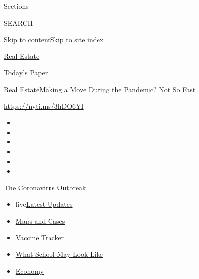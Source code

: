 Sections

SEARCH

\protect\hyperlink{site-content}{Skip to
content}\protect\hyperlink{site-index}{Skip to site index}

\href{https://www.nytimes.com/section/realestate}{Real Estate}

\href{https://myaccount.nytimes.com/auth/login?response_type=cookie\&client_id=vi}{}

\href{https://www.nytimes.com/section/todayspaper}{Today's Paper}

\href{/section/realestate}{Real Estate}\textbar{}Making a Move During
the Pandemic? Not So Fast

\url{https://nyti.ms/3hDO6YI}

\begin{itemize}
\item
\item
\item
\item
\item
\item
\end{itemize}

\href{https://www.nytimes.com/news-event/coronavirus?action=click\&pgtype=Article\&state=default\&region=TOP_BANNER\&context=storylines_menu}{The
Coronavirus Outbreak}

\begin{itemize}
\tightlist
\item
  live\href{https://www.nytimes.com/2020/08/01/world/coronavirus-covid-19.html?action=click\&pgtype=Article\&state=default\&region=TOP_BANNER\&context=storylines_menu}{Latest
  Updates}
\item
  \href{https://www.nytimes.com/interactive/2020/us/coronavirus-us-cases.html?action=click\&pgtype=Article\&state=default\&region=TOP_BANNER\&context=storylines_menu}{Maps
  and Cases}
\item
  \href{https://www.nytimes.com/interactive/2020/science/coronavirus-vaccine-tracker.html?action=click\&pgtype=Article\&state=default\&region=TOP_BANNER\&context=storylines_menu}{Vaccine
  Tracker}
\item
  \href{https://www.nytimes.com/interactive/2020/07/29/us/schools-reopening-coronavirus.html?action=click\&pgtype=Article\&state=default\&region=TOP_BANNER\&context=storylines_menu}{What
  School May Look Like}
\item
  \href{https://www.nytimes.com/live/2020/07/31/business/stock-market-today-coronavirus?action=click\&pgtype=Article\&state=default\&region=TOP_BANNER\&context=storylines_menu}{Economy}
\end{itemize}

